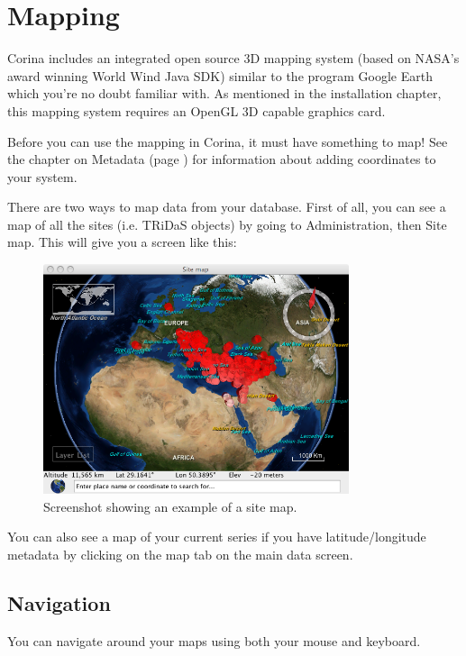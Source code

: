 \chapter{Mapping}

Corina includes an integrated open source 3D mapping system (based on NASA's award winning World Wind Java SDK) similar to the program Google Earth which you're no doubt familiar with. As mentioned in the installation chapter, this mapping system requires an OpenGL 3D capable graphics card. 

Before you can use the mapping in Corina, it must have something to map! See the chapter on Metadata (page \pageref{txt:metadata}) for information about adding coordinates to your system.

There are two ways to map data from your database. First of all, you can see a map of all the sites (i.e. TRiDaS objects) by going to Administration, then Site map. This will give you a screen like this:

\begin{figure}[hbtp]
  \caption{Screenshot showing an example of a site map.}
  \label{fig:map}
  \centering
    \includegraphics[width=0.8\textwidth]{Images/sitemap.png}
\end{figure}


You can also see a map of your current series if you have latitude/longitude metadata by clicking on the map tab on the main data screen. 

\section{Navigation}

You can navigate around your maps using both your mouse and keyboard.

